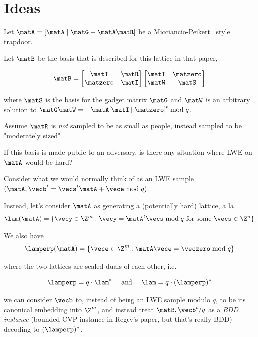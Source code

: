 \section{Ideas}
\label{sec:ideas}


Let $\matA = [\bar{\matA} \mid \matG - \bar{\matA}\matR]$ be a Micciancio-Peikert~\cite{DBLP:conf/eurocrypt/MicciancioP12} style trapdoor.

Let $\matB$ be the basis that is described for this lattice in that paper, 

\[\matB = \begin{bmatrix}\matI&\matR\\\matzero&\matI\end{bmatrix} \begin{bmatrix}\matI&\matzero\\\matW&\matS\\\end{bmatrix}\]

where $\matS$ is the basis for the gadget matrix $\matG$ and $\matW$ is an arbitrary solution to $\matG\matW = -\matA[\matI \mid \matzero]^t \bmod{q}$. 


Assume $\matR$ is \emph{not} sampled to be as small as people, instead sampled to be "moderately sized" 

If this basis is made public to an adversary, is there any situation where LWE on $\matA$ would be hard? 




Consider what we would normally think of as an LWE sample $(\matA, \vecb^t = \vecs^t\matA+\vece \bmod{q})$.

Instead, let's consider $\matA$ as generating a (potentially hard) lattice, a la~\cite{DBLP:conf/stoc/GentryPV08}
\[\lam(\matA) = \{\vecy \in \Z^m : \vecy = \matA^{t}\vecs \bmod{q} \text{ for some } \vecs \in \Z^n \}\]

We also have 
\[\lamperp(\matA) = \{ \vece \in \Z^m : \matA\vece = \veczero \bmod {q} \}\]

where the two lattices are scaled duals of each other, i.e. 

\[\lamperp = q \cdot \lam^*\quad\text{ and }\quad \lam = q \cdot (\lamperp)^*\]


 we can consider $\vecb$ to, instead of being an LWE sample modulo $q$, to be its canonical embedding into $\Z^m$, and instead treat $\matB, \vecb^t/q$ as a \emph{BDD instance} (bounded CVP instance in Regev's paper, but that's really BDD) decoding to $(\lamperp)^*$. 

